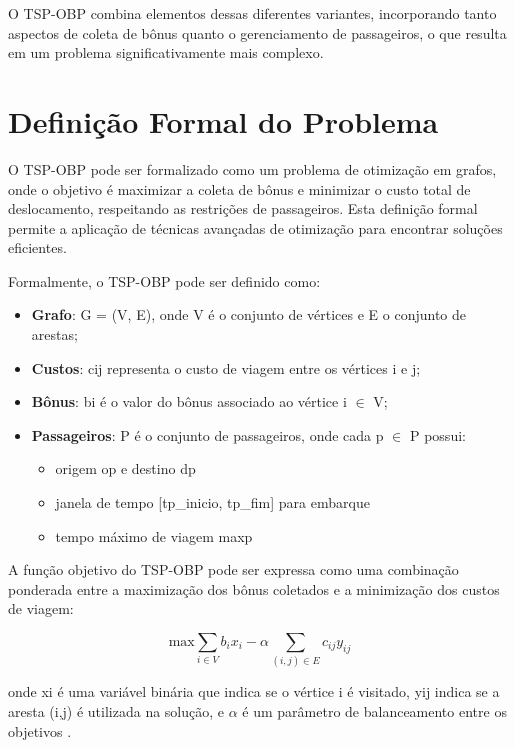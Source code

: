 \documentclass[12pt, a4paper]{report}
\begin{document}
O TSP-OBP combina elementos dessas diferentes variantes, incorporando tanto aspectos de coleta de bônus quanto o gerenciamento de passageiros, o que resulta em um problema significativamente mais complexo.

\section{Definição Formal do Problema}
O TSP-OBP pode ser formalizado como um problema de otimização em grafos, onde o objetivo é maximizar a coleta de bônus e minimizar o custo total de deslocamento, respeitando as restrições de passageiros. Esta definição formal permite a aplicação de técnicas avançadas de otimização para encontrar soluções eficientes.

Formalmente, o TSP-OBP pode ser definido como:

\begin{itemize}
    \item \textbf{Grafo}: G = (V, E), onde V é o conjunto de vértices e E o conjunto de arestas;
    \item \textbf{Custos}: cij representa o custo de viagem entre os vértices i e j;
    \item \textbf{Bônus}: bi é o valor do bônus associado ao vértice i $\in$ V;
    \item \textbf{Passageiros}: P é o conjunto de passageiros, onde cada p $\in$ P possui:
    \begin{itemize}
        \item origem op e destino dp
        \item janela de tempo [tp\_inicio, tp\_fim] para embarque
        \item tempo máximo de viagem maxp
    \end{itemize}
\end{itemize}

A função objetivo do TSP-OBP pode ser expressa como uma combinação ponderada entre a maximização dos bônus coletados e a minimização dos custos de viagem:

\begin{equation}
    \text{max} \sum_{i \in V} b_i x_i - \alpha \sum_{(i,j) \in E} c_{ij} y_{ij}
\end{equation}

onde xi é uma variável binária que indica se o vértice i é visitado, yij indica se a aresta (i,j) é utilizada na solução, e $\alpha$ é um parâmetro de balanceamento entre os objetivos \cite{lopesfilho2019}.
\end{document}
